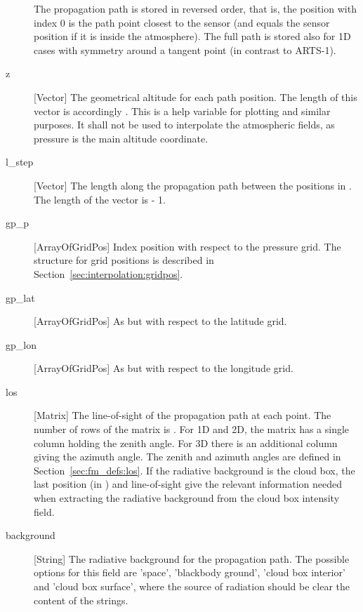 \begin{description}
     The propagation path is stored in reversed order, that is, the
     position with index 0 is the path point closest to the sensor
     (and equals the sensor position if it is inside the atmosphere).
     The full path is stored also for 1D cases with symmetry around a
     tangent point (in contrast to ARTS-1). 
     
  \item[z] [Vector] The geometrical altitude for each path position. The
     length of this vector is accordingly . This is a help
     variable for plotting and similar purposes. It shall not be used to
     interpolate the atmospheric fields, as pressure is the main altitude
     coordinate.

  \item[l\_step] [Vector] The length along the propagation path between
     the positions in . The length of the vector is
      - 1. 
     
   \item[gp\_p] [ArrayOfGridPos] Index position with respect to the
     pressure grid. The structure for grid positions is described in
     Section~\ref{sec:interpolation:gridpos}. 
     
   \item[gp\_lat] [ArrayOfGridPos] As  but with
     respect to the latitude grid.

   \item[gp\_lon] [ArrayOfGridPos] As  but with
     respect to the longitude grid.
     
   \item[los] [Matrix] The line-of-sight of the propagation path at
     each point. The number of rows of the matrix is .
     For 1D and 2D, the matrix has a single column holding the zenith
     angle. For 3D there is an additional column giving the azimuth
     angle. The zenith and azimuth angles are defined in
     Section~\ref{sec:fm_defs:los}. If the radiative background is the
     cloud box, the last position (in ) and
     line-of-sight give the relevant information needed when
     extracting the radiative background from the cloud box intensity
     field.
     
   \item[background] [String] The radiative background for the
     propagation path. The possible
     options for this field are 'space', 'blackbody ground', 'cloud
     box interior' and 'cloud box surface', where the source of
     radiation should be clear the content of the strings.


\end{description}
